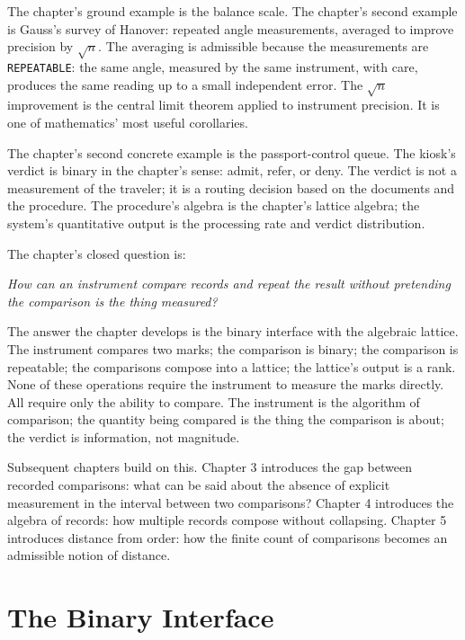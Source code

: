 \begin{chapteressay}
The chapter's ground example is the balance scale. The chapter's
second example is Gauss's survey of Hanover: repeated angle
measurements, averaged to improve precision by $\sqrt{n}$. The
averaging is admissible because the measurements are
\texttt{REPEATABLE}: the same angle, measured by the same
instrument, with care, produces the same reading up to a small
independent error. The $\sqrt{n}$ improvement is the central
limit theorem applied to instrument precision. It is one of
mathematics' most useful corollaries.

The chapter's second concrete example is the passport-control
queue. The kiosk's verdict is binary in the chapter's sense:
admit, refer, or deny. The verdict is not a measurement of the
traveler; it is a routing decision based on the documents and
the procedure. The procedure's algebra is the chapter's
lattice algebra; the system's quantitative output is the
processing rate and verdict distribution.

The chapter's closed question is:

\begin{center}
\emph{How can an instrument compare records and repeat the result
without pretending the comparison is the thing measured?}
\end{center}

The answer the chapter develops is the binary interface with
the algebraic lattice. The instrument compares two marks; the
comparison is binary; the comparison is repeatable; the
comparisons compose into a lattice; the lattice's output is a
rank. None of these operations require the instrument to
measure the marks directly. All require only the ability to
compare. The instrument is the algorithm of comparison; the
quantity being compared is the thing the comparison is about;
the verdict is information, not magnitude.

Subsequent chapters build on this. Chapter 3 introduces the
gap between recorded comparisons: what can be said about the
absence of explicit measurement in the interval between two
comparisons? Chapter 4 introduces the algebra of records:
how multiple records compose without collapsing. Chapter 5
introduces distance from order: how the finite count of
comparisons becomes an admissible notion of distance.

\end{chapteressay}

\section{The Binary Interface}
\label{se:the-binary-interface}

